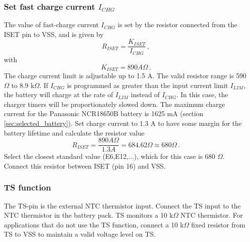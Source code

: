 \documentclass[11pt,a4paper]{article}
\begin{document}
\subsubsection{Set fast charge current $I_{CHG}$}\label{sec:fastchargecurrent}
The value of fast-charge current $I_{CHG}$ is set by the resistor connected from the ISET pin to VSS, and is given by \cite{bib:BQ24075}
\begin{equation}\label{equ:relationK_ISET}
R_{ISET} = \frac{K_{ISET}}{I_{CHG}} \,,
\end{equation}
with
\begin{equation}\label{equ:K_ISET}
K_{ISET} = 890 A\Omega \,.
\end{equation}
The charge current limit is adjustable up to 1.5 A. The valid resistor range is 590 $\Omega$ to 8.9 k$\Omega$. If $I_{CHG}$ is programmed as greater than the input current limit $I_{LIM}$, the battery will charge at the rate of $I_{LIM}$ instead of $I_{CHG}$. In this case, the charger timers will be proportionately slowed down. The maximum charge current for the Panasonic NCR18650B battery is 1625 mA (section \ref{sec:selected_battery}). Set charge current to 1.3 A to have some margin for the battery lifetime and calculate the resistor value
\begin{equation}
R_{ISET} = \frac{890 A\Omega}{1.3 A} = 684.62 \Omega \approx 680 \Omega \,.
\end{equation}
Select the closest standard value (E6,E12,...), which for this case is 680 $\Omega$. Connect this resistor between ISET (pin 16) and VSS.



\subsubsection{TS function}
The TS-pin is the external NTC thermistor input. Connect the TS input to the NTC thermistor in the battery pack. TS monitors a 10 k$\Omega$ NTC thermistor. For applications that do not use the TS function, connect a 10 k$\Omega$ fixed resistor from TS to VSS to maintain a valid voltage level on TS.
\end{document}
